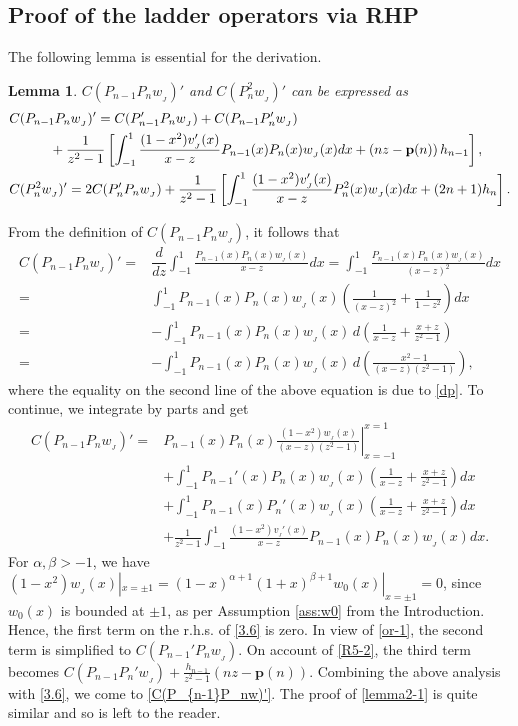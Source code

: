 \documentclass[12pt,a4paper]{article}    %
\makeatletter
\newtheorem{lemma}[theorem]{Lemma}
\renewenvironment{proof}[1][\proofname]{\par
	\pushQED{\qed}%
	\normalfont \topsep6\p@\@plus6\p@\relax
	\trivlist
	\item[\hskip\labelsep
	\itshape #1\@addpunct{.}]\ignorespaces
}{%
	\popQED\endtrivlist\@endpefalse
}
\numberwithin{equation}{section}
\makeatother
\begin{document}
\subsection{Proof of the ladder operators via RHP}\label{proof-J-RHP}
The following lemma is essential for the derivation.
\begin{lemma}\label{lemma-J}
$C(P_{n-1}P_nw_{_J})'$ and $C(P_n^2w_{_J})'$ can be expressed as
 \begin{align}
 &C(P_{n-1}P_nw_{_J})'=C(P_{n-1}'P_nw_{_J})+C(P_{n-1}P_n'w_{_J})\nonumber\\
 &\quad\qquad+\frac{1}{z^2-1}\left[\int_{-1}^{1}\frac{(1-x^2)v_{_J}'(x)}{x-z}P_{n-1}(x)P_n(x)w_{_J}(x)dx+\left(nz-\mathbf{p}(n)\right)h_{n-1}\right],\label{C(P_{n-1}P_nw)'}\\	 &C(P_n^2w_{_J})'= 2C(P_n'P_nw_{_J})+\frac{1}{z^2-1}\left[\int_{-1}^{1}\frac{(1-x^2)v_{_J}'(x)}{x-z}P_n^2(x)w_{_J}(x)dx+(2n+1) h_n\right].\label{lemma2-1}
\end{align}
\end{lemma}
\begin{proof}
From the definition of $C(P_{n-1}P_nw_{_J})$, it follows that     	 
\begin{align}		 C(P_{n-1}P_nw_{_J})'=&\dfrac{d}{dz}\int_{-1}^{1}\frac{P_{n-1}(x)P_n(x)w_{_J}(x)}{x-z}dx=	 \int_{-1}^{1}\frac{P_{n-1}(x)P_n(x)w_{_J}(x)}{(x-z)^2}dx\nonumber\\		 =&\int_{-1}^{1}{P_{n-1}(x)P_n(x)w_{_J}(x)}\left(\frac{1}{(x-z)^2}+\frac{1}{1-z^2}\right)dx\nonumber\\		 =&-\int_{-1}^{1}{P_{n-1}(x)P_n(x)w_{_J}(x)}\,d\left(\frac{1}{x-z}+\frac{x+z}{z^2-1}\right)\nonumber\\		 =&-\int_{-1}^{1}{P_{n-1}(x)P_n(x)w_{_J}(x)}\,d\left(\frac{x^2-1}{(x-z)(z^2-1)}\right),\label{J-C-d}
\end{align}
where the equality on the second line of the above equation is due to \eqref{dp}. To continue, we integrate by parts and get
    \begin{align}		 C(P_{n-1}P_nw_{_J})'=&\left.P_{n-1}(x)P_n(x)\frac{(1-x^2)w_{_J}(x)}{(x-z)(z^2-1)}\right|_{x=-1}^{x=1}\nonumber\\&+\int_{-1}^{1}P_{n-1}'(x)P_n(x)w_{_J}(x)\left(\frac{1}{x-z}+\frac{x+z}{z^2-1}\right)	 dx\nonumber\\
    &+\int_{-1}^{1}P_{n-1}(x)P_n'(x)w_{_J}(x)\left(\frac{1}{x-z}+\frac{x+z}{z^2-1}\right)	 dx\nonumber\\
    &+\frac{1}{z^2-1}\int_{-1}^{1}\frac{(1-x^2)v_{_J}'(x)}{x-z}P_{n-1}(x)P_n(x)w_{_J}(x)dx.\label{3.6}
\end{align}
For $\alpha,\beta>-1$, we have $(1-x^2)w_{_J}(x)|_{x=\pm1}=(1-x)^{\alpha+1}(1+x)^{\beta+1}w_0(x)|_{x=\pm1}=0$, since $w_0(x)$ is bounded at $\pm1$, as per Assumption \ref{ass:w0} from the Introduction. Hence, the first term on the r.h.s. of \eqref{3.6} is zero. In view of \eqref{or-1}, the second term is simplified to $C(P_{n-1}'P_nw_{_J})$.
On account of \eqref{R5-2}, the third term becomes $C(P_{n-1}P_n'w_{_J})+\frac{h_{n-1 }}{z^2-1}\left(nz-\textbf{p}(n)\right)$.
Combining the above analysis with \eqref{3.6}, we come to \eqref{C(P_{n-1}P_nw)'}.
The proof of \eqref{lemma2-1} is quite similar and so is left to the reader.
\end{proof}	
\end{document}
